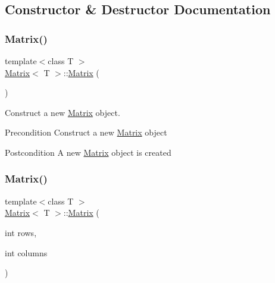 \subsection{Constructor \& Destructor Documentation}
\mbox{\label{class_matrix_a9d567e3a121b1be0c3f9c461cab524fe}} 
\subsubsection{\texorpdfstring{Matrix()}{Matrix()}\hspace{0.1cm}{\footnotesize\ttfamily [1/4]}}
{\footnotesize\ttfamily template$<$class T $>$ \\
\mbox{\hyperlink{class_matrix}{Matrix}}$<$ T $>$\+::\mbox{\hyperlink{class_matrix}{Matrix}} (\begin{DoxyParamCaption}{ }\end{DoxyParamCaption})}



Construct a new \mbox{\hyperlink{class_matrix}{Matrix}} object. 

\begin{DoxyPrecond}{Precondition}
Construct a new \mbox{\hyperlink{class_matrix}{Matrix}} object 
\end{DoxyPrecond}
\begin{DoxyPostcond}{Postcondition}
A new \mbox{\hyperlink{class_matrix}{Matrix}} object is created 
\end{DoxyPostcond}
\mbox{\label{class_matrix_a44eb4cf3a243fe027112d1ace474ead9}} 
\subsubsection{\texorpdfstring{Matrix()}{Matrix()}\hspace{0.1cm}{\footnotesize\ttfamily [2/4]}}
{\footnotesize\ttfamily template$<$class T $>$ \\
\mbox{\hyperlink{class_matrix}{Matrix}}$<$ T $>$\+::\mbox{\hyperlink{class_matrix}{Matrix}} (\begin{DoxyParamCaption}\item[{int}]{rows,  }\item[{int}]{columns }\end{DoxyParamCaption})}



